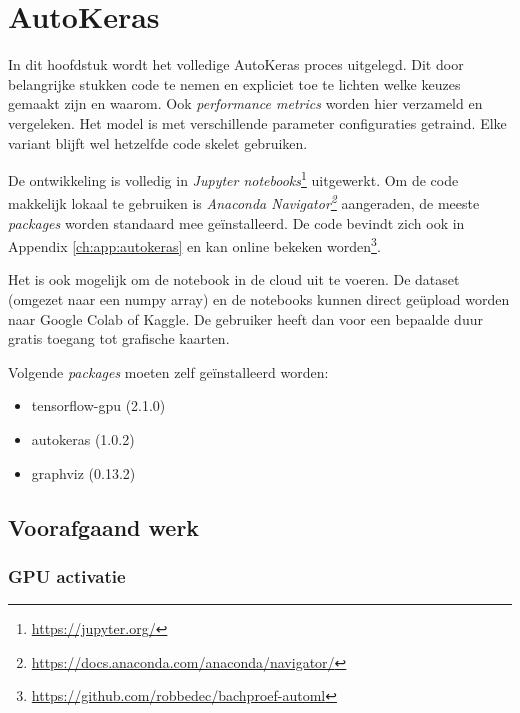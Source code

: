 
\chapter{AutoKeras}
\label{ch:autokeras}

In dit hoofdstuk wordt het volledige AutoKeras proces uitgelegd. Dit door belangrijke stukken code te nemen en expliciet toe te lichten welke keuzes gemaakt zijn en waarom. Ook \textit{performance metrics} worden hier verzameld en vergeleken. Het model is met verschillende parameter configuraties getraind. Elke variant blijft wel hetzelfde code skelet gebruiken.

De ontwikkeling is volledig in \textit{Jupyter notebooks}\footnote{\url{https://jupyter.org/}} uitgewerkt. Om de code makkelijk lokaal te gebruiken is \textit{Anaconda Navigator\footnote{\url{https://docs.anaconda.com/anaconda/navigator/}}} aangeraden, de meeste \textit{packages} worden standaard mee geïnstalleerd. De code bevindt zich ook in Appendix \ref{ch:app:autokeras} en kan online bekeken worden\footnote{\url{https://github.com/robbedec/bachproef-automl}}.

Het is ook mogelijk om de notebook in de cloud uit te voeren. De dataset (omgezet naar een numpy array) en de notebooks kunnen direct geüpload worden naar Google Colab of Kaggle. De gebruiker heeft dan voor een bepaalde duur gratis toegang tot grafische kaarten.

Volgende \textit{packages} moeten zelf geïnstalleerd worden:

\begin{itemize}
    \item tensorflow-gpu (2.1.0)
    \item autokeras (1.0.2)
    \item graphviz (0.13.2)
\end{itemize}

\section{Voorafgaand werk}
\label{sec:autokeras-before}

\subsection{GPU activatie}
\label{subsec:autokeras-gpu}


